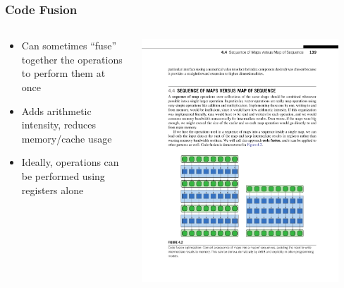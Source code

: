 \documentclass[xcolor=dvipsnames]{beamer}
\begin{document}
		\begin{frame} \frametitle{Code Fusion}
      \begin{columns}
        \begin{column}{0.48\textwidth}
          \begin{itemize}
            \item
              Can sometimes ``fuse'' together the operations to perform them at
              once
            \item
              Adds arithmetic intensity, reduces memory/cache usage
            \item
              Ideally, operations can be performed using registers alone
          \end{itemize}
        \end{column}
        \begin{column}{0.48\textwidth}
          \centering
          \includegraphics[width=0.9\textwidth]{images/figure-4-2-2}
        \end{column}
      \end{columns}
		\end{frame}
\end{document}
